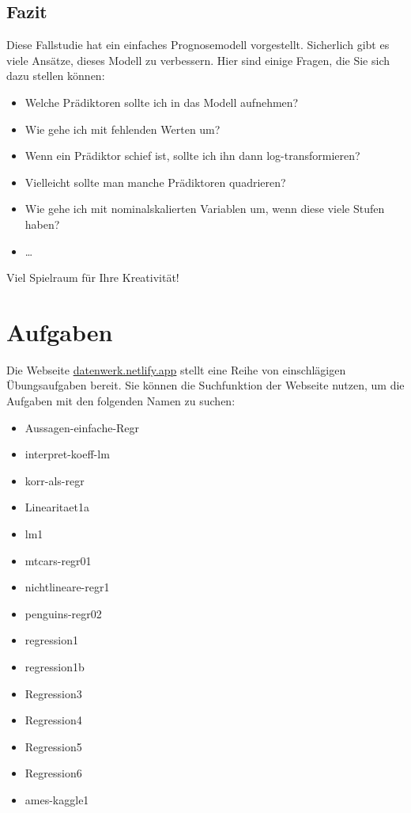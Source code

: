 \documentclass[
  letterpaper,
  oneside,
  open=any]{scrbook}
\providecommand{\tightlist}{%
  \setlength{\itemsep}{0pt}\setlength{\parskip}{0pt}}\usepackage{longtable,booktabs,array}
\theoremstyle{definition}
\theoremstyle{definition}
\theoremstyle{definition}
\theoremstyle{remark}
\begin{document}
\subsection{Fazit}\label{fazit-3}

Diese Fallstudie hat ein einfaches Prognosemodell vorgestellt.
Sicherlich gibt es viele Ansätze, dieses Modell zu verbessern. Hier sind
einige Fragen, die Sie sich dazu stellen können:

\begin{itemize}
\tightlist
\item
  Welche Prädiktoren sollte ich in das Modell aufnehmen?
\item
  Wie gehe ich mit fehlenden Werten um?
\item
  Wenn ein Prädiktor schief ist, sollte ich ihn dann log-transformieren?
\item
  Vielleicht sollte man manche Prädiktoren quadrieren?
\item
  Wie gehe ich mit nominalskalierten Variablen um, wenn diese viele
  Stufen haben?
\item
  \ldots{}
\end{itemize}

Viel Spielraum für Ihre Kreativität!

\section{Aufgaben}\label{aufgaben-7}

Die Webseite \href{https://datenwerk.netlify.app}{datenwerk.netlify.app}
stellt eine Reihe von einschlägigen Übungsaufgaben bereit. Sie können
die Suchfunktion der Webseite nutzen, um die Aufgaben mit den folgenden
Namen zu suchen:

\begin{itemize}
\tightlist
\item
  Aussagen-einfache-Regr
\item
  interpret-koeff-lm
\item
  korr-als-regr
\item
  Linearitaet1a
\item
  lm1
\item
  mtcars-regr01
\item
  nichtlineare-regr1
\item
  penguins-regr02
\item
  regression1
\item
  regression1b
\item
  Regression3
\item
  Regression4
\item
  Regression5
\item
  Regression6
\item
  ames-kaggle1
\end{itemize}
\end{document}
